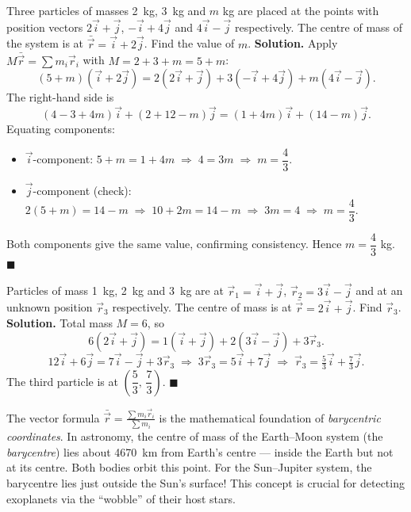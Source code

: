 \documentclass[11pt]{article}
\begin{document}
\begin{exoresolu}
Three particles of masses \SI{2}{kg}, \SI{3}{kg} and $m$ kg are placed at the points with position vectors $2\vec{i}+\vec{j}$, $-\vec{i}+4\vec{j}$ and $4\vec{i}-\vec{j}$ respectively. The centre of mass of the system is at $\bar{\vec{r}} = \vec{i}+2\vec{j}$. Find the value of $m$.
\tcblower
\textbf{Solution.} Apply $M\bar{\vec{r}} = \sum m_i\vec{r}_i$ with $M = 2+3+m = 5+m$:
\[
(5+m)(\vec{i}+2\vec{j}) = 2(2\vec{i}+\vec{j}) + 3(-\vec{i}+4\vec{j}) + m(4\vec{i}-\vec{j}).
\]
The right-hand side is
\[
(4-3+4m)\vec{i} + (2+12-m)\vec{j} = (1+4m)\vec{i} + (14-m)\vec{j}.
\]
Equating components:
\begin{itemize}
\item $\vec{i}$-component: $5+m = 1+4m \;\Rightarrow\; 4 = 3m \;\Rightarrow\; m = \dfrac{4}{3}$.
\item $\vec{j}$-component (check): $2(5+m) = 14-m \;\Rightarrow\; 10+2m = 14-m \;\Rightarrow\; 3m = 4 \;\Rightarrow\; m = \dfrac{4}{3}$.
\end{itemize}
Both components give the same value, confirming consistency. Hence $m = \dfrac{4}{3}$ kg. \hfill$\blacksquare$
\end{exoresolu}

\begin{exoresolu}
Particles of mass \SI{1}{kg}, \SI{2}{kg} and \SI{3}{kg} are at $\vec{r}_1 = \vec{i}+\vec{j}$, $\vec{r}_2 = 3\vec{i}-\vec{j}$ and at an unknown position $\vec{r}_3$ respectively. The centre of mass is at $\bar{\vec{r}} = 2\vec{i}+\vec{j}$. Find $\vec{r}_3$.
\tcblower
\textbf{Solution.} Total mass $M = 6$, so
\[
6(2\vec{i}+\vec{j}) = 1(\vec{i}+\vec{j}) + 2(3\vec{i}-\vec{j}) + 3\vec{r}_3.
\]
\[
12\vec{i}+6\vec{j} = 7\vec{i}-\vec{j} + 3\vec{r}_3
\;\Rightarrow\;
3\vec{r}_3 = 5\vec{i}+7\vec{j}
\;\Rightarrow\;
\vec{r}_3 = \tfrac{5}{3}\vec{i}+\tfrac{7}{3}\vec{j}.
\]
The third particle is at $\left(\dfrac{5}{3},\,\dfrac{7}{3}\right)$. \hfill$\blacksquare$
\end{exoresolu}

\begin{savaistu}
The vector formula $\bar{\vec{r}} = \frac{\sum m_i\vec{r}_i}{\sum m_i}$ is the mathematical foundation of \emph{barycentric coordinates}. In astronomy, the centre of mass of the Earth–Moon system (the \emph{barycentre}) lies about \SI{4670}{km} from Earth's centre — inside the Earth but not at its centre. Both bodies orbit this point. For the Sun–Jupiter system, the barycentre lies just outside the Sun's surface! This concept is crucial for detecting exoplanets via the ``wobble'' of their host stars.
\end{savaistu}
\end{document}
